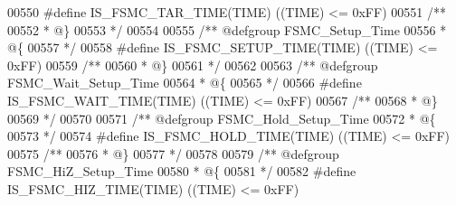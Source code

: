 \begin{DoxyCode}
00550 \textcolor{preprocessor}{#}\textcolor{preprocessor}{define} \textcolor{preprocessor}{IS\_FSMC\_TAR\_TIME}\textcolor{preprocessor}{(}\textcolor{preprocessor}{TIME}\textcolor{preprocessor}{)} \textcolor{preprocessor}{(}\textcolor{preprocessor}{(}\textcolor{preprocessor}{TIME}\textcolor{preprocessor}{)} \textcolor{preprocessor}{<=} 0xFF\textcolor{preprocessor}{)}
00551 \textcolor{comment}{/**}
00552 \textcolor{comment}{  * @\}}
00553 \textcolor{comment}{  */}
00554 
00555 \textcolor{comment}{/** @defgroup FSMC\_Setup\_Time }
00556 \textcolor{comment}{  * @\{}
00557 \textcolor{comment}{  */}
00558 \textcolor{preprocessor}{#}\textcolor{preprocessor}{define} \textcolor{preprocessor}{IS\_FSMC\_SETUP\_TIME}\textcolor{preprocessor}{(}\textcolor{preprocessor}{TIME}\textcolor{preprocessor}{)} \textcolor{preprocessor}{(}\textcolor{preprocessor}{(}\textcolor{preprocessor}{TIME}\textcolor{preprocessor}{)} \textcolor{preprocessor}{<=} 0xFF\textcolor{preprocessor}{)}
00559 \textcolor{comment}{/**}
00560 \textcolor{comment}{  * @\}}
00561 \textcolor{comment}{  */}
00562 
00563 \textcolor{comment}{/** @defgroup FSMC\_Wait\_Setup\_Time }
00564 \textcolor{comment}{  * @\{}
00565 \textcolor{comment}{  */}
00566 \textcolor{preprocessor}{#}\textcolor{preprocessor}{define} \textcolor{preprocessor}{IS\_FSMC\_WAIT\_TIME}\textcolor{preprocessor}{(}\textcolor{preprocessor}{TIME}\textcolor{preprocessor}{)} \textcolor{preprocessor}{(}\textcolor{preprocessor}{(}\textcolor{preprocessor}{TIME}\textcolor{preprocessor}{)} \textcolor{preprocessor}{<=} 0xFF\textcolor{preprocessor}{)}
00567 \textcolor{comment}{/**}
00568 \textcolor{comment}{  * @\}}
00569 \textcolor{comment}{  */}
00570 
00571 \textcolor{comment}{/** @defgroup FSMC\_Hold\_Setup\_Time }
00572 \textcolor{comment}{  * @\{}
00573 \textcolor{comment}{  */}
00574 \textcolor{preprocessor}{#}\textcolor{preprocessor}{define} \textcolor{preprocessor}{IS\_FSMC\_HOLD\_TIME}\textcolor{preprocessor}{(}\textcolor{preprocessor}{TIME}\textcolor{preprocessor}{)} \textcolor{preprocessor}{(}\textcolor{preprocessor}{(}\textcolor{preprocessor}{TIME}\textcolor{preprocessor}{)} \textcolor{preprocessor}{<=} 0xFF\textcolor{preprocessor}{)}
00575 \textcolor{comment}{/**}
00576 \textcolor{comment}{  * @\}}
00577 \textcolor{comment}{  */}
00578 
00579 \textcolor{comment}{/** @defgroup FSMC\_HiZ\_Setup\_Time }
00580 \textcolor{comment}{  * @\{}
00581 \textcolor{comment}{  */}
00582 \textcolor{preprocessor}{#}\textcolor{preprocessor}{define} \textcolor{preprocessor}{IS\_FSMC\_HIZ\_TIME}\textcolor{preprocessor}{(}\textcolor{preprocessor}{TIME}\textcolor{preprocessor}{)} \textcolor{preprocessor}{(}\textcolor{preprocessor}{(}\textcolor{preprocessor}{TIME}\textcolor{preprocessor}{)} \textcolor{preprocessor}{<=} 0xFF\textcolor{preprocessor}{)}

\end{DoxyCode}
